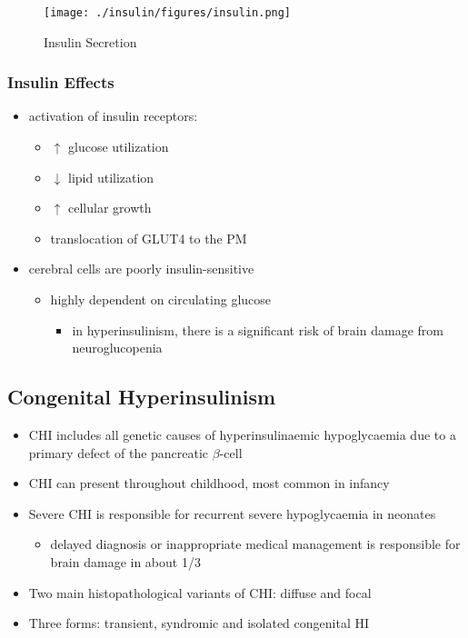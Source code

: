 \documentclass{scrartcl}
\begin{document}
\begin{figure}[htbp]
\centering
\texttt{[image: ./insulin/figures/insulin.png]}
\caption[insulin]{\label{fig:org7f8879f}
Insulin Secretion}
\end{figure}

\subsubsection{Insulin Effects}
\label{sec:org6573475}
\begin{itemize}
\item activation of insulin receptors:
\begin{itemize}
\item \(\uparrow\) glucose utilization
\item \(\downarrow\) lipid utilization
\item \(\uparrow\) cellular growth
\item translocation of GLUT4 to the PM
\end{itemize}
\item cerebral cells are poorly insulin-sensitive
\begin{itemize}
\item highly dependent on circulating glucose
\begin{itemize}
\item in hyperinsulinism, there is a significant risk of brain damage
from neuroglucopenia
\end{itemize}
\end{itemize}
\end{itemize}

\subsection{Congenital Hyperinsulinism}
\label{sec:org8c25833}
\begin{itemize}
\item CHI includes all genetic causes of hyperinsulinaemic
hypoglycaemia due to a primary defect of the pancreatic
\(\beta\)-cell
\item CHI can present throughout childhood, most common in infancy
\item Severe CHI is responsible for recurrent severe hypoglycaemia in neonates
\begin{itemize}
\item delayed diagnosis or inappropriate medical management is responsible for brain damage in about 1/3
\end{itemize}
\item Two main histopathological variants of CHI: diffuse and focal
\item Three forms: transient, syndromic and isolated congenital HI
\end{itemize}
\end{document}
